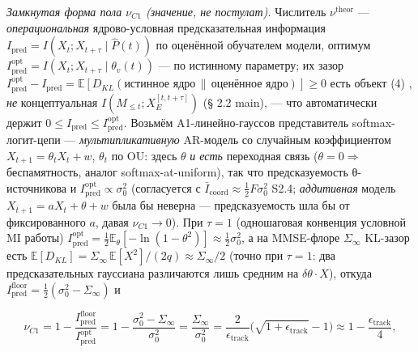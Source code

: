 \documentclass[12pt]{iopart}
\begin{document}
\emph{Замкнутая форма пола \(\nu_{C1}\) (значение, не постулат).} Числитель \(\nu^{\text{theor}}\) --- \emph{операциональная} ядрово-условная предсказательная информация \(I_{\text{pred}} = I(X_t;X_{t+\tau}\mid\hat P(t))\) по оценённой обучателем модели, оптимум \(I_{\text{pred}}^{\text{opt}} = I(X_t;X_{t+\tau}\mid\theta_v(t))\) --- по истинному параметру; их зазор \(I_{\text{pred}}^{\text{opt}}-I_{\text{pred}} = \mathbb{E}[D_{KL}(\text{истинное ядро}\,\|\,\text{оценённое ядро})] \ge 0\) есть объект (4) \cite{Andriishin2026b}, \emph{не} концептуальная \(I(M_{\le t};X_E^{[t,t+\tau]})\) (§ 2.2 main), --- что автоматически держит \(0 \le I_{\text{pred}} \le I_{\text{pred}}^{\text{opt}}\). Возьмём A1-линейно-гауссов представитель softmax-логит-цепи --- \emph{мультипликативную} AR-модель со случайным коэффициентом \(X_{t+1} = \theta_t X_t + w\), \(\theta_t\) по OU: здесь \(\theta\) \emph{и есть} переходная связь (\(\theta = 0 \Rightarrow\) беспамятность, аналог softmax-at-uniform), так что предсказуемость θ-источникова и \(I_{\text{pred}}^{\text{opt}} \propto \sigma_0^2\) (согласуется с \(\bar I_{\text{coord}} \approx \tfrac12 F\sigma_0^2\) \cite{Andriishin2026b} S2.4; \emph{аддитивная} модель \(X_{t+1} = aX_t+\theta+w\) была бы неверна --- предсказуемость шла бы от фиксированного \(a\), давая \(\nu_{C1}\to0\)). При \(\tau = 1\) (одношаговая конвенция условной MI работы) \(I_{\text{pred}}^{\text{opt}} = \tfrac12\mathbb{E}_\theta[-\ln(1-\theta^2)] \approx \tfrac12\sigma_0^2\), а на MMSE-флоре \(\Sigma_\infty\) KL-зазор есть \(\mathbb{E}[D_{KL}] = \Sigma_\infty\,\mathbb{E}[X^2]/(2q) \approx \Sigma_\infty/2\) (точно при \(\tau = 1\): два предсказательных гауссиана различаются лишь средним на \(\delta\theta\cdot X\)), откуда \(I_{\text{pred}}^{\text{floor}} = \tfrac12(\sigma_0^2-\Sigma_\infty)\) и



\begin{equation}\nu_{C1} = 1 - \frac{I_{\text{pred}}^{\text{floor}}}{I_{\text{pred}}^{\text{opt}}} = 1 - \frac{\sigma_0^2-\Sigma_\infty}{\sigma_0^2} = \frac{\Sigma_\infty}{\sigma_0^2} = \frac{2}{\epsilon_{\text{track}}}\big(\sqrt{1+\epsilon_{\text{track}}}-1\big) \approx 1 - \frac{\epsilon_{\text{track}}}{4}, \tag{S3.3b}\end{equation}
\end{document}
